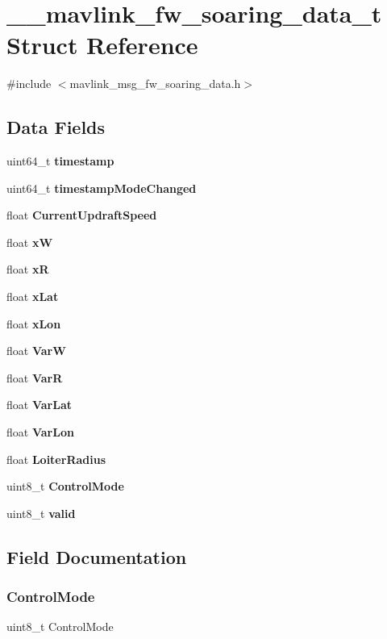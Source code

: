 \section{\+\_\+\+\_\+mavlink\+\_\+fw\+\_\+soaring\+\_\+data\+\_\+t Struct Reference}
\label{struct____mavlink__fw__soaring__data__t}


{\ttfamily \#include $<$mavlink\+\_\+msg\+\_\+fw\+\_\+soaring\+\_\+data.\+h$>$}

\subsection*{Data Fields}
\begin{DoxyCompactItemize}
\item 
uint64\+\_\+t \textbf{ timestamp}
\item 
uint64\+\_\+t \textbf{ timestamp\+Mode\+Changed}
\item 
float \textbf{ Current\+Updraft\+Speed}
\item 
float \textbf{ xW}
\item 
float \textbf{ xR}
\item 
float \textbf{ x\+Lat}
\item 
float \textbf{ x\+Lon}
\item 
float \textbf{ VarW}
\item 
float \textbf{ VarR}
\item 
float \textbf{ Var\+Lat}
\item 
float \textbf{ Var\+Lon}
\item 
float \textbf{ Loiter\+Radius}
\item 
uint8\+\_\+t \textbf{ Control\+Mode}
\item 
uint8\+\_\+t \textbf{ valid}
\end{DoxyCompactItemize}


\subsection{Field Documentation}
\mbox{\label{struct____mavlink__fw__soaring__data__t_ab9bf2f04f0adba9445c73ae6db7bb66d}} 
\subsubsection{Control\+Mode}
{\footnotesize\ttfamily uint8\+\_\+t Control\+Mode}

